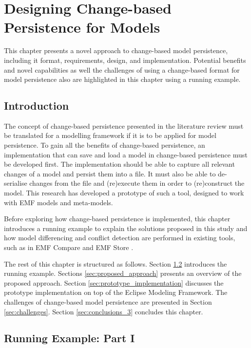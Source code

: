 \chapter{Designing Change-based Persistence for Models}
\label{ch:change_based_model_persistence}

This chapter presents a novel approach to change-based model persistence, including it format, requirements, design, and implementation. Potential benefits and novel capabilities as well the challenges of using a change-based format for model persistence also are highlighted in this chapter using a running example.

\section{Introduction}
\label{Introduction}

The concept of change-based persistence presented in the literature review must be translated for a modelling framework if it is to be applied for model persistence. To gain all the benefits of change-based persistence, an implementation that can save and load a model in change-based persistence must be developed first. The implementation should be able to capture all relevant changes of a model and persist them into a file. It must also be able to de-serialise changes from the file and (re)execute them in order to (re)construct the model. This research has developed a prototype of such a tool, designed to work with EMF models and meta-models.

Before exploring how change-based persistence is implemented, this chapter introduces a running example to explain the solutions proposed in this study and how model differencing and conflict detection are performed in existing tools, such as in EMF Compare \cite{emfcompare2018developer} and EMF Store \cite{emfstore2019what}.

The rest of this chapter is structured as follows. Section \ref{sec:running_example_1} introduces the running example.
Sections \ref{sec:proposed_approach} presents an overview of the proposed approach.
Section \ref{sec:prototype_implementation} discusses the prototype implementation on top of the Eclipse Modeling Framework.
The challenges of change-based model persistence are presented in
Section \ref{sec:challenges}. Section \ref{sec:conclusions_3} concludes this chapter.

\section{Running Example: Part I}
\label{sec:running_example_1}

